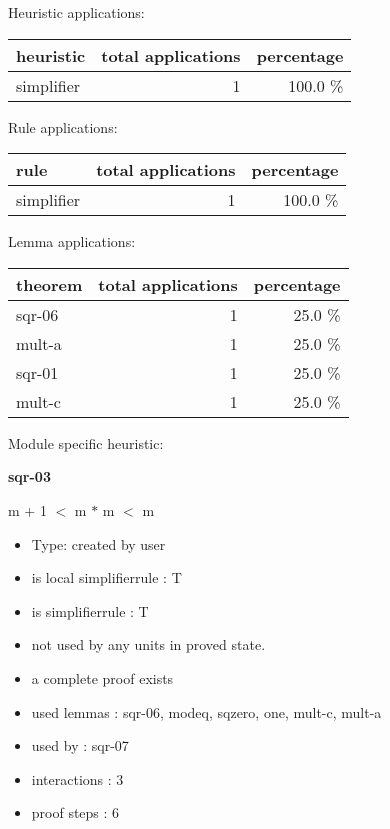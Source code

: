 \documentclass[a4paper]{article}
\begin{document}
\medskip


Heuristic applications:

\begin{supertabular}{l|r|r}
heuristic	& total applications & percentage \\ \hline
simplifier & 1 & 100.0 \% \\

\end{supertabular}

Rule applications:

\begin{supertabular}{l|r|r}
rule	        & total applications & percentage \\ \hline
simplifier & 1 & 100.0 \% \\

\end{supertabular}

Lemma applications:

\begin{supertabular}{l|r|r}
theorem	        & total applications & percentage \\ \hline
sqr-06 & 1 & 25.0 \% \\
mult-a & 1 & 25.0 \% \\
sqr-01 & 1 & 25.0 \% \\
mult-c & 1 & 25.0 \% \\

\end{supertabular}

Module specific heuristic:

\pagebreak

{\LARGE\bf sqr-03}\label{lemma-sqr-03}

\medskip

 \Fol m + 1 $<$ m $*$ m  $<$ m

\begin{itemize}

\item Type: created by user

\item is local simplifierrule : T
\item is simplifierrule : T
\item not used by any units in proved state.
\item       a complete proof exists
\item       used lemmas  : sqr-06, modeq, sqzero, one, mult-c, mult-a
\item       used by      : sqr-07
\item       interactions : 3
\item       proof steps  : 6
\end{itemize}
\end{document}

